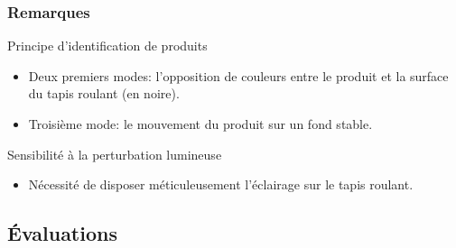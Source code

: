 \documentclass{beamer}
\begin{document}
\begin{frame}
\frametitle{Remarques}


\begin{exampleblock}{\Large{Principe d'identification de produits}}
\begin{itemize}
	\item Deux premiers modes: l'opposition de couleurs entre le produit et la surface du tapis roulant (en noire). 
	\item Troisième mode: le mouvement du produit sur un fond stable.
\end{itemize}
\end{exampleblock}

\medskip
\begin{exampleblock}{\Large{Sensibilité à la perturbation lumineuse}}
\begin{itemize}
\item Nécessité de disposer méticuleusement l'éclairage sur le tapis roulant.
\end{itemize}
\end{exampleblock}

\end{frame}


\subsection{Évaluations} %
\end{document}
